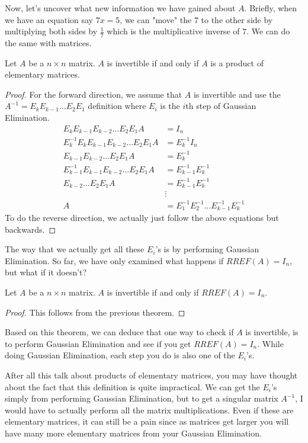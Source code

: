 Now, let's uncover what new information we have gained about $A$. Briefly, when we have an equation say $7x=5$, we can "move" the $7$ to the other side by multiplying both sides by $\frac{1}{7}$ which is the multiplicative inverse of $7$. We can do the same with matrices.
\begin{theorem}
    Let $A$ be a $n\times n$ matrix. $A$ is invertible if and only if $A$ is a product of elementary matrices.
\end{theorem}
\begin{proof}
For the forward direction, we assume that $A$ is invertible and use the $A^{-1}=E_kE_{k-1}\ldots E_2E_1$ definition where $E_i$ is the $i$th step of Gaussian Elimination.
\begin{align*}
    E_kE_{k-1}E_{k-2}\ldots E_2E_1A&=I_n\\
    E_k^{-1}E_kE_{k-1}E_{k-2}\ldots E_2E_1A&=E_k^{-1}I_n\\
    E_{k-1}E_{k-2}\ldots E_2E_1A&=E_k^{-1}\\
    E_{k-1}^{-1}E_{k-1}E_{k-2}\ldots E_2E_1A&=E_{k-1}^{-1}E_k^{-1}\\
    E_{k-2}\ldots E_2E_1A&=E_{k-1}^{-1}E_k^{-1}\\
    &\vdots\\
    A&=E_{1}^{-1}E_{2}^{-1}\ldots E_{k-1}^{-1}E_k^{-1}
\end{align*}
To do the reverse direction, we actually just follow the above equations but backwards.
\end{proof}
The way that we actually get all these $E_i$'s is by performing Gaussian Elimination. So far, we have only examined what happens if $RREF(A)=I_n$, but what if it doesn't?
\begin{theorem}
    Let $A$ be a $n\times n$ matrix. $A$ is invertible if and only if $RREF(A)=I_n$.
\end{theorem}
\begin{proof}
    This follows from the previous theorem.
\end{proof}
Based on this theorem, we can deduce that one way to check if $A$ is invertible, is to perform Gaussian Elimination and see if you get $RREF(A)=I_n$. While doing Gaussian Elimination, each step you do is also one of the $E_i$'s.

After all this talk about products of elementary matrices, you may have thought about the fact that this definition is quite impractical. We can get the $E_i$'s simply from performing Gaussian Elimination, but to get a singular matrix $A^{-1}$, I would have to actually perform all the matrix multiplications. Even if these are elementary matrices, it can still be a pain since as matrices get larger you will have many more elementary matrices from your Gaussian Elimination.

